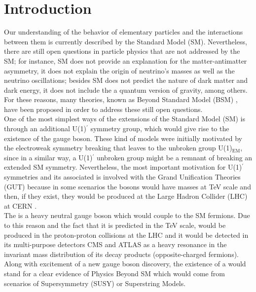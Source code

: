 \chapter*{Introduction}

Our understanding of the behavior of elementary particles and the interactions between them is 
currently described by the Standard Model (SM). Nevertheless, there are still open 
questions in particle physics that are not addressed by the SM; for instance, SM does 
not provide an explanation for the matter-antimatter asymmetry, it does not explain the origin of neutrino's masses as well as the 
neutrino oscillations; besides SM does not predict the nature of dark matter and dark energy,
it does not include the a quantum version of gravity, among others. For these reasons, 
many theories, known as Beyond Standard Model (BSM) \cite{BSM}, have been proposed in order to address these still open questions. \\

One of the most simplest ways of the extensions of the Standard Model (SM) is through an additional
U(1)$^{\prime}$ symmetry group, which would give rise to the existence of the \Zprime gauge boson. These 
kind of models were initially motivated by the electroweak symmetry breaking that leaves to the unbroken group 
U(1)$_{\text{EM}}$, since in a similar way, a U(1)$^{\prime}$ unbroken group might be a remnant of breaking  
an extended SM symmetry. Nevertheless, the most important motivation for U(1)$^{\prime}$ symmetries 
and its associated \Zprime is involved with the Grand Unification Theories (GUT) because in some scenarios the \Zprime bosons
would have masses at TeV scale and then, if they exist, they would be produced at the Large Hadron Collider (LHC) at CERN \cite{Langacker:2008yv}. \\

The \Zprime is a heavy neutral gauge boson which would couple to the SM fermions. Due to this reason and the fact that it is predicted 
in the TeV scale, \Zprime would be produced in the proton-proton collisions at the LHC and it would be detected in its multi-purpose detectors 
CMS and ATLAS as a heavy resonance in the invariant mass distribution of its decay products (opposite-charged fermions). Along with
excitement of a new gauge boson discovery, the existence of a \Zprime  would stand for a clear evidence of Physics
Beyond SM which would come from scenarios of Supersymmetry (SUSY) or Superstring Models. \\




